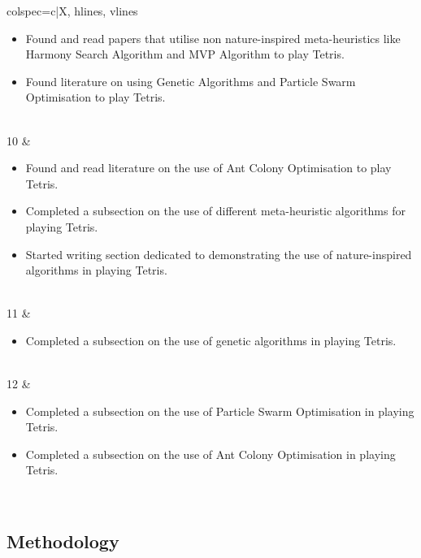 \documentclass[a4paper, 12pt]{extreport}
\begin{document}
\begin{longtblr}[
				caption = Weekly breakdown of work done for Literature Review Chapter.
				]{colspec={c|X}, hlines, vlines}
\begin{varwidth}[t]{\linewidth}
\begin{itemize}[topsep=0pt,parsep=0pt]
						\item Found and read papers that utilise non nature-inspired meta-heuristics like Harmony Search Algorithm and MVP Algorithm to play Tetris.
						\item Found literature on using Genetic Algorithms and Particle Swarm Optimisation to play Tetris.
					\end{itemize}
				\end{varwidth}\\
				10 & \begin{varwidth}[t]{\linewidth}
					\begin{itemize}[topsep=0pt,parsep=0pt]
						\item Found and read literature on the use of Ant Colony Optimisation to play Tetris.
						\item Completed a subsection on the use of different meta-heuristic algorithms for playing Tetris.
						\item Started writing section dedicated to demonstrating the use of nature-inspired algorithms in playing Tetris.
					\end{itemize}
				\end{varwidth}\\
				11 & \begin{varwidth}[t]{\linewidth}
					\begin{itemize}[topsep=0pt,parsep=0pt]
						\item Completed a subsection on the use of genetic algorithms in playing Tetris.
					\end{itemize}
				\end{varwidth}\\
				12 & \begin{varwidth}[t]{\linewidth}
					\begin{itemize}[topsep=0pt,parsep=0pt]
						\item Completed a subsection on the use of Particle Swarm Optimisation in playing Tetris.
						\item Completed a subsection on the use of Ant Colony Optimisation in playing Tetris.
					\end{itemize}
				\end{varwidth}\\
			\end{longtblr}
		
		\subsection{Methodology}
		
\end{document}
